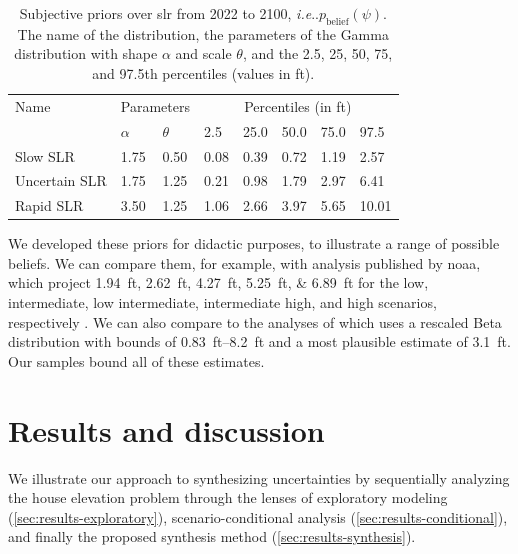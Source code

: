 \documentclass{agujournal2019}
\makeatletter
\DeclareRobustCommand\onedot{\futurelet\@let@token\@onedot}
\def\@onedot{\ifx\@let@token.\else.\null\fi\xspace}
\def\ie{\emph{i.e}\onedot} \def\Ie{\emph{I.e}\onedot}
\makeatother
\begin{document}
\begin{table}[ht]
  \centering
  \caption{
    Subjective priors over \gls{slr} from 2022 to 2100, \ie $p_\mathrm{belief}(\psi)$.
    The name of the distribution, the parameters of the Gamma distribution with shape $\alpha$ and scale $\theta$, and the 2.5, 25, 50, 75, and 97.5th percentiles (values in \si{ft}).
  }\label{tab:slr-priors}
  \begin{tabular}{llllllll}
    \toprule
    Name          & \multicolumn{2}{c}{Parameters} & \multicolumn{5}{c}{Percentiles (in \si{ft})}                                     \\
    \cmidrule(lr){2-3}
    \cmidrule(lr){4-8}
                  & $\alpha$                       & $\theta$                                     & 2.5  & 25.0 & 50.0 & 75.0 & 97.5  \\
    \midrule
    Slow SLR      & 1.75                           & 0.50                                         & 0.08 & 0.39 & 0.72 & 1.19 & 2.57  \\
    Uncertain SLR & 1.75                           & 1.25                                         & 0.21 & 0.98 & 1.79 & 2.97 & 6.41  \\
    Rapid SLR     & 3.50                           & 1.25                                         & 1.06 & 2.66 & 3.97 & 5.65 & 10.01 \\
    \bottomrule
  \end{tabular}

\end{table}

We developed these priors for didactic purposes, to illustrate a range of possible beliefs.
We can compare them, for example, with analysis published by \gls{noaa}, which project \SIlist{1.94;2.62;4.27;5.25;6.89}{ft} for the low, intermediate, low intermediate, intermediate high, and high scenarios, respectively \cite[table.~2.4]{sweet_slr:2022}.
We can also compare to the analyses of  which uses a rescaled Beta distribution with bounds of \SIrange{0.83}{8.2}{ft} and a most plausible estimate of \SI{3.1}{ft}.
Our samples bound all of these estimates.

\section{Results and discussion}\label{sec:results}

We illustrate our approach to synthesizing uncertainties by sequentially analyzing the house elevation problem through the lenses of exploratory modeling (\cref{sec:results-exploratory}), scenario-conditional analysis (\cref{sec:results-conditional}), and finally the proposed synthesis method (\cref{sec:results-synthesis}).
\end{document}
